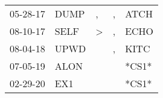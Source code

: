 \begin{supertabular}{p{0.07\textwidth}p{0.06\textwidth}p{0.02\textwidth}p{0.02\textwidth}p{0.06\textwidth}}
 05-28-17\textsuperscript{} &  DUMP\textsuperscript{} &                , &             , &  ATCH\textsuperscript{} \\
 08-10-17\textsuperscript{} &  SELF\textsuperscript{} &     \textgreater &             , &  ECHO\textsuperscript{} \\
 08-04-18\textsuperscript{} &  UPWD\textsuperscript{} &                  &             , &  KITC\textsuperscript{} \\
 07-05-19\textsuperscript{} &  ALON\textsuperscript{} &                  &               &                   *CS1* \\
 02-29-20\textsuperscript{} &   EX1\textsuperscript{} &                  &               &                   *CS1* \\
\end{supertabular}

